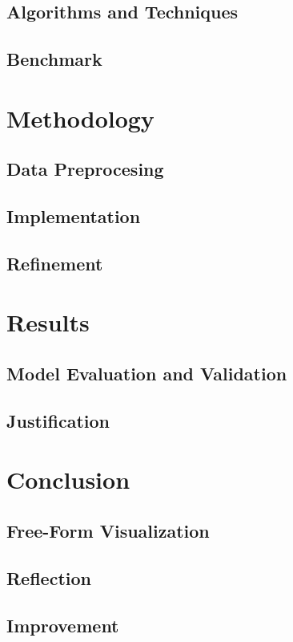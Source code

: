 \documentclass[a4paper]{article}
\begin{document}
	\subsection{Algorithms and Techniques}
	
	\subsection{Benchmark}
	
	\section{Methodology}
	
	\subsection{Data Preprocesing}
	
	\subsection{Implementation}
	
	\subsection{Refinement}
	
	\section{Results}
	
	\subsection{Model Evaluation and Validation}
	
	\subsection{Justification}
	
	\section{Conclusion}
	
	\subsection{Free-Form Visualization}
	
	\subsection{Reflection}
	
	\subsection{Improvement}
	
\end{document}
